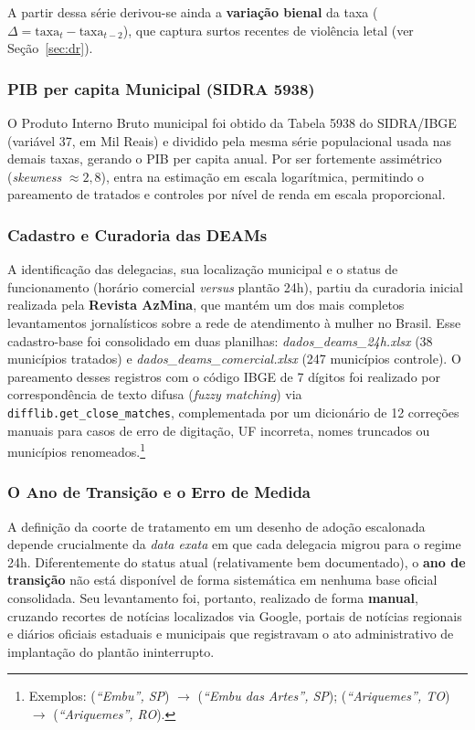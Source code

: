 \documentclass[twocolumn, 10pt]{article}
\begin{document}
A partir dessa série derivou-se ainda a \textbf{variação bienal} da taxa
($\Delta = \text{taxa}_{t} - \text{taxa}_{t-2}$), que captura surtos recentes de
violência letal (ver Seção~\ref{sec:dr}).

\subsubsection{PIB per capita Municipal (SIDRA 5938)}
O Produto Interno Bruto municipal foi obtido da Tabela 5938 do SIDRA/IBGE
(variável 37, em Mil Reais) e dividido pela mesma série populacional usada nas
demais taxas, gerando o PIB per capita anual. Por ser fortemente assimétrico
(\textit{skewness} $\approx 2{,}8$), entra na estimação em escala logarítmica,
permitindo o pareamento de tratados e controles por nível de renda em escala
proporcional.

\subsubsection{Cadastro e Curadoria das DEAMs}
A identificação das delegacias, sua localização municipal e o status de
funcionamento (horário comercial \textit{versus} plantão 24h), partiu da
curadoria inicial realizada pela \textbf{Revista AzMina}, que mantém um dos mais
completos levantamentos jornalísticos sobre a rede de atendimento à mulher no
Brasil. Esse cadastro-base foi consolidado em duas planilhas:
\textit{dados\_deams\_24h.xlsx} (38 municípios tratados) e
\textit{dados\_deams\_comercial.xlsx} (247 municípios controle). O pareamento
desses registros com o código IBGE de 7 dígitos foi realizado por correspondência
de texto difusa (\textit{fuzzy matching}) via \texttt{difflib.get\_close\_matches},
complementada por um dicionário de 12 correções manuais para casos de erro de
digitação, UF incorreta, nomes truncados ou municípios renomeados.\footnote{Exemplos:
(\textit{``Embu'', SP}) $\to$ (\textit{``Embu das Artes'', SP});
(\textit{``Ariquemes'', TO}) $\to$ (\textit{``Ariquemes'', RO}).}

\subsubsection{O Ano de Transição e o Erro de Medida}
\label{sec:transicao}
A definição da coorte de tratamento em um desenho de adoção escalonada depende
crucialmente da \textit{data exata} em que cada delegacia migrou para o regime
24h. Diferentemente do status atual (relativamente bem documentado), o
\textbf{ano de transição} não está disponível de forma sistemática em nenhuma
base oficial consolidada. Seu levantamento foi, portanto, realizado de forma
\textbf{manual}, cruzando recortes de notícias localizados via Google, portais
de notícias regionais e diários oficiais estaduais e municipais que registravam
o ato administrativo de implantação do plantão ininterrupto.
\end{document}
